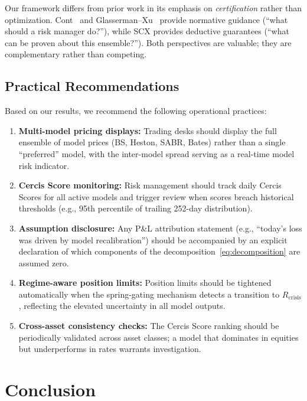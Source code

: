 \documentclass[11pt,a4paper]{article}
\theoremstyle{plain}
\theoremstyle{definition}
\theoremstyle{remark}
\newcommand{\SCX}{\textsc{SCX}}
\begin{document}
Our framework differs from prior work in its emphasis on \emph{certification} rather than optimization. Cont~\citep{cont2006model} and Glasserman--Xu~\citep{glasserman2014robust} provide normative guidance (``what should a risk manager do?''), while \SCX{} provides deductive guarantees (``what can be proven about this ensemble?''). Both perspectives are valuable; they are complementary rather than competing.

\subsection{Practical Recommendations}

Based on our results, we recommend the following operational practices:

\begin{enumerate}[label=\textbf{R\arabic*}, leftmargin=*]
  \item \textbf{Multi-model pricing displays:} Trading desks should display the full ensemble of model prices (BS, Heston, SABR, Bates) rather than a single ``preferred'' model, with the inter-model spread serving as a real-time model risk indicator.
  \item \textbf{Cercis Score monitoring:} Risk management should track daily Cercis Scores for all active models and trigger review when scores breach historical thresholds (e.g., 95th percentile of trailing 252-day distribution).
  \item \textbf{Assumption disclosure:} Any P\&L attribution statement (e.g., ``today's loss was driven by model recalibration'') should be accompanied by an explicit declaration of which components of the decomposition~\eqref{eq:decomposition} are assumed zero.
  \item \textbf{Regime-aware position limits:} Position limits should be tightened automatically when the spring-gating mechanism detects a transition to $R_{\text{crisis}}$, reflecting the elevated uncertainty in all model outputs.
  \item \textbf{Cross-asset consistency checks:} The Cercis Score ranking should be periodically validated across asset classes; a model that dominates in equities but underperforms in rates warrants investigation.
\end{enumerate}

\section{Conclusion}
\end{document}
